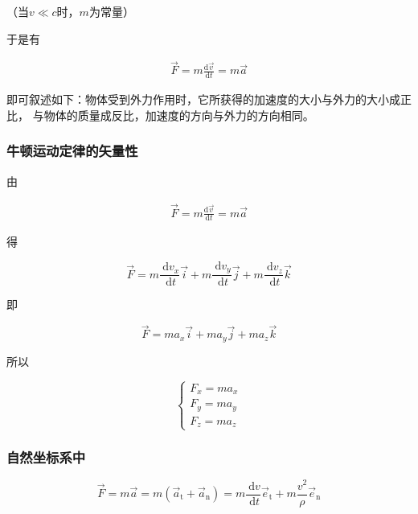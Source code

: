 \documentclass[
	12pt, %
	a4paper, %
]{myLegrandOrangeBook}
\newcommand{\rmd}{\mathrm{d}}
\newcommand{\deriv}[2]{\frac{\rmd #1}{\rmd #2}}
\begin{document}
    （当\(v\ll c\)时，\(m\)为常量）

    于是有

    \begin{align}
        \overrightarrow{F} = m \deriv{\overrightarrow{v}}{t} = m \overrightarrow{a}
    \end{align}

    即可叙述如下：物体受到外力作用时，它所获得的加速度的大小与外力的大小成正比，
    与物体的质量成反比，加速度的方向与外力的方向相同。

\subsubsection{牛顿运动定律的矢量性}

    由

    \begin{align*}
        \overrightarrow{F} = m \deriv{\overrightarrow{v}}{t} = m \overrightarrow{a}
    \end{align*}

    得

    \begin{equation}
        \overrightarrow{F}=m \frac{\mathrm{~d} v_x}{\mathrm{~d} t} \overrightarrow{i}+m \frac{\mathrm{~d} v_y}{\mathrm{~d} t} \overrightarrow{j}+m \frac{\mathrm{~d} v_z}{\mathrm{~d} t} \overrightarrow{k}
    \end{equation}

    即

    \begin{equation}
        \overrightarrow{F}=m a_x \overrightarrow{i}+m a_y \overrightarrow{j}+m a_z \overrightarrow{k}
    \end{equation}

    所以

    \begin{equation}
        \left\{\begin{array}{l}
        F_x=m a_x \\
        F_y=m a_y \\
        F_z=m a_z
        \end{array}\right.
    \end{equation}

\subsubsection{自然坐标系中}

    \begin{equation}
        \overrightarrow{F}=m \overrightarrow{a}=
        m\left(\overrightarrow{a}_{\mathrm{t}}+\overrightarrow{a}_{\mathrm{n}}\right)=
        m \frac{\mathrm{~d} v}{\mathrm{~d} t} \overrightarrow{e}_{\mathrm{t}}+m \frac{v^2}{\rho} \overrightarrow{e}_{\mathrm{n}}
    \end{equation}
\end{document}
